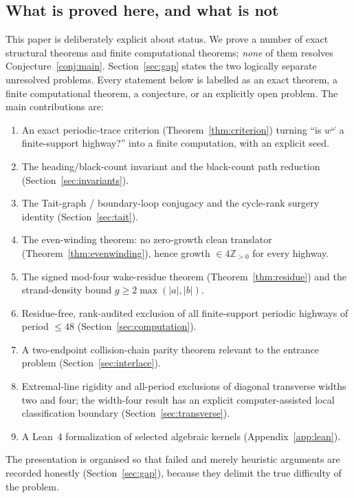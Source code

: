 \documentclass[11pt,reqno]{amsart}
\theoremstyle{plain}
\theoremstyle{definition}
\newcommand{\Z}{\mathbb{Z}}
\newcommand{\growth}{g}
\begin{document}
\subsection{What is proved here, and what is not}
This paper is deliberately explicit about status. We prove a number of exact
structural theorems and finite computational theorems; \emph{none} of them
resolves Conjecture~\ref{conj:main}. Section~\ref{sec:gap} states the two
logically separate unresolved problems. Every statement below is labelled as an
exact theorem, a finite computational theorem, a conjecture, or an explicitly
open problem. The main contributions are:

\begin{enumerate}[leftmargin=2.2em,label=(\arabic*)]
\item An exact periodic-trace criterion (Theorem~\ref{thm:criterion}) turning
``is $w^\omega$ a finite-support highway?'' into a finite computation, with an
explicit seed.
\item The heading/black-count invariant and the black-count path reduction
(Section~\ref{sec:invariants}).
\item The Tait-graph / boundary-loop conjugacy and the cycle-rank surgery
identity (Section~\ref{sec:tait}).
\item The even-winding theorem: no zero-growth clean translator
(Theorem~\ref{thm:evenwinding}), hence growth $\in 4\Z_{>0}$ for every highway.
\item The signed mod-four wake-residue theorem
(Theorem~\ref{thm:residue}) and the strand-density bound $\growth\ge
2\max(|a|,|b|)$.
\item Residue-free, rank-audited exclusion of all finite-support periodic
highways of period $\le 48$ (Section~\ref{sec:computation}).
\item A two-endpoint collision-chain parity theorem relevant to the entrance
problem (Section~\ref{sec:interlace}).
\item Extremal-line rigidity and all-period exclusions of diagonal transverse
widths two and four; the width-four result has an explicit computer-assisted local
classification boundary (Section~\ref{sec:transverse}).
\item A Lean~4 formalization of selected algebraic kernels (Appendix~\ref{app:lean}).
\end{enumerate}

The presentation is organised so that failed and merely heuristic arguments are
recorded honestly (Section~\ref{sec:gap}), because they delimit the true
difficulty of the problem.
\end{document}
